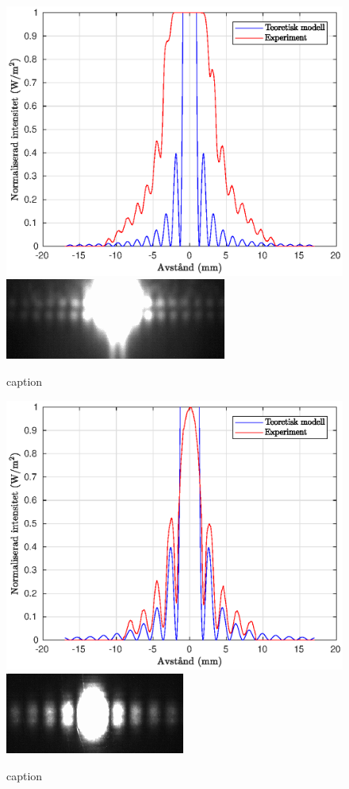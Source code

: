 \documentclass[a4paper]{article}
\begin{document}
\begin{figure}[h!]
	\centering
	\includegraphics[width=0.75\linewidth]{Data/Figurer/trad+enkelspalt.eps}
	\includegraphics[width=0.5\linewidth]{Data/Figurer/trad+enkelspalt.png}
	\caption{caption}
	\label{fig:trad+enkelspalt}
\end{figure}

\begin{figure}[h!]
	\centering
	\includegraphics[width=0.75\linewidth]{Data/Figurer/variabelEnkelspalt1.eps}
	\includegraphics[width=0.5\linewidth]{Data/Figurer/variabelEnkelspalt1.png}
	\caption{caption}
	\label{fig:variabelEnkelspalt1}
\end{figure}
\end{document}
